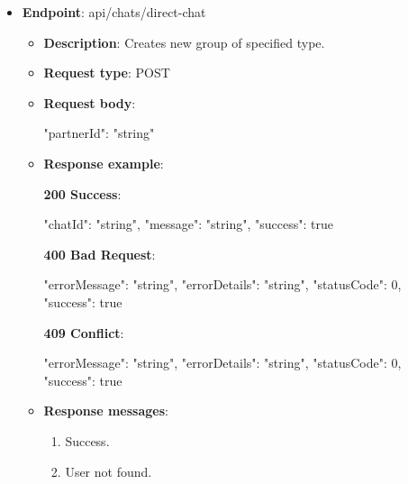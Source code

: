 \begin{itemize}
\begin{itemize}
        \item \textbf{Response messages}:
        \begin{enumerate}
            \item Success.
            \item User not found.
        \end{enumerate}
    \end{itemize}

    \item \textbf{Endpoint}: api/chats/direct-chat
    \begin{itemize}
        \item \textbf{Description}: Creates new group of specified type.
        \item \textbf{Request type}: POST
        \item \textbf{Request body}:
        \begin{spverbatim}
        {
            "partnerId": "string"
        }
        \end{spverbatim}
        \item \textbf{Response example}:

        \textbf{200 Success}:

        \begin{spverbatim}
        {
            "chatId": "string",
            "message": "string",
            "success": true
        }
        \end{spverbatim}

        \textbf{400 Bad Request}:

        \begin{spverbatim}
        {
            "errorMessage": "string",
            "errorDetails": "string",
            "statusCode": 0,
            "success": true
        }
        \end{spverbatim}

        \textbf{409 Conflict}:

        \begin{spverbatim}
        {
            "errorMessage": "string",
            "errorDetails": "string",
            "statusCode": 0,
            "success": true
        }
        \end{spverbatim}

        \item \textbf{Response messages}:
        \begin{enumerate}
            \item Success.
            \item User not found.
        \end{enumerate}
    \end{itemize}


\end{itemize}
